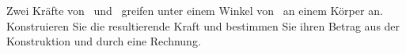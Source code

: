 Zwei Kräfte von \FEiO\ und \FZwO\ greifen unter einem Winkel von \alKO\ an einem Körper an. Konstruieren Sie die resultierende Kraft und bestimmen Sie ihren Betrag aus der Konstruktion und durch eine Rechnung.

